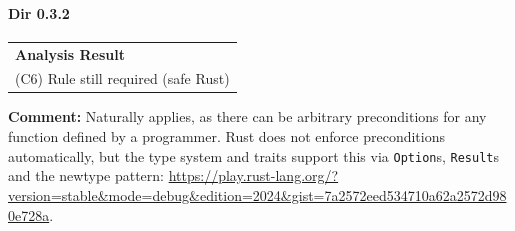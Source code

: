 \paragraph{Dir 0.3.2}
\begin{longtable}{p{13cm}}
\textbf{Analysis Result} \\
(C6) Rule still required (safe Rust) \\
\end{longtable}
\textbf{Comment:} Naturally applies, as there can be arbitrary preconditions for any function defined by a programmer. Rust does not enforce preconditions automatically, but the type system and traits support this via \texttt{Option}s, \texttt{Result}s and the newtype pattern: \url{https://play.rust-lang.org/?version=stable&mode=debug&edition=2024&gist=7a2572eed534710a62a2572d980e728a}. \\
